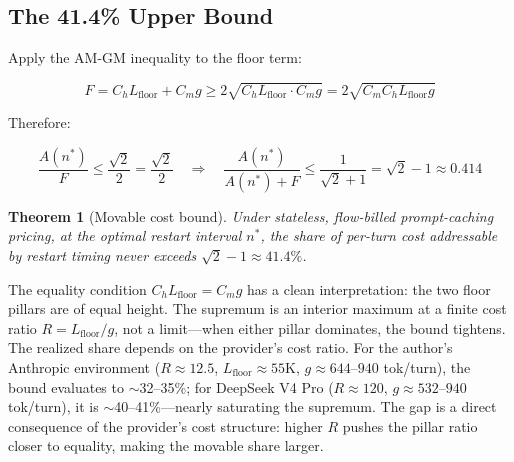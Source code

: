 \documentclass[11pt]{article}
\newtheorem{theorem}{Theorem}[section]
\theoremstyle{definition}
\theoremstyle{remark}
\begin{document}
\subsection{The 41.4\% Upper Bound}

Apply the AM-GM inequality to the floor term:

\begin{equation}
F = C_h L_{\text{floor}} + C_m g \ge 2\sqrt{C_h L_{\text{floor}} \cdot C_m g} = 2 \sqrt{C_m C_h L_{\text{floor}} g}
\end{equation}

Therefore:

\begin{equation}
\frac{A(n^*)}{F} \le \frac{\sqrt{2}}{\,2\,} = \frac{\sqrt{2}}{2}
\quad\Longrightarrow\quad
\frac{A(n^*)}{A(n^*) + F} \le \frac{1}{\sqrt{2}+1} = \sqrt{2}-1 \approx 0.414
\end{equation}

\begin{theorem}[Movable cost bound]
Under stateless, flow-billed prompt-caching pricing, at the optimal restart interval $n^*$, the share of per-turn cost addressable by restart timing never exceeds $\sqrt{2}-1 \approx 41.4\%$.
\end{theorem}

The equality condition $C_h L_{\text{floor}} = C_m g$ has a clean interpretation: the two floor pillars are of equal height. The supremum is an interior maximum at a finite cost ratio $R = L_{\text{floor}}/g$, not a limit---when either pillar dominates, the bound tightens. The realized share depends on the provider's cost ratio. For the author's Anthropic environment ($R \approx 12.5$, $L_{\text{floor}} \approx 55$K, $g \approx 644$--$940$ tok/turn), the bound evaluates to $\sim$32--35\%; for DeepSeek V4 Pro ($R \approx 120$, $g \approx 532$--$940$ tok/turn), it is $\sim$40--41\%---nearly saturating the supremum. The gap is a direct consequence of the provider's cost structure: higher $R$ pushes the pillar ratio closer to equality, making the movable share larger.
\end{document}
